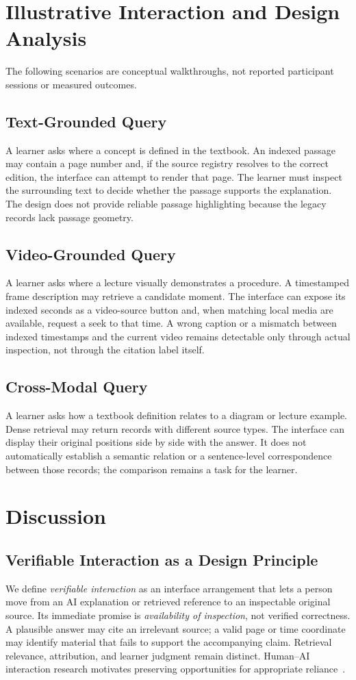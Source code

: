 \documentclass[manuscript,screen,nonacm]{acmart}
\begin{document}
\section{Illustrative Interaction and Design Analysis}
The following scenarios are conceptual walkthroughs, not reported participant sessions or measured outcomes.

\subsection{Text-Grounded Query}
A learner asks where a concept is defined in the textbook. An indexed passage may contain a page number and, if the source registry resolves to the correct edition, the interface can attempt to render that page. The learner must inspect the surrounding text to decide whether the passage supports the explanation. The design does not provide reliable passage highlighting because the legacy records lack passage geometry.

\subsection{Video-Grounded Query}
A learner asks where a lecture visually demonstrates a procedure. A timestamped frame description may retrieve a candidate moment. The interface can expose its indexed seconds as a video-source button and, when matching local media are available, request a seek to that time. A wrong caption or a mismatch between indexed timestamps and the current video remains detectable only through actual inspection, not through the citation label itself.

\subsection{Cross-Modal Query}
A learner asks how a textbook definition relates to a diagram or lecture example. Dense retrieval may return records with different source types. The interface can display their original positions side by side with the answer. It does not automatically establish a semantic relation or a sentence-level correspondence between those records; the comparison remains a task for the learner.

\section{Discussion}
\subsection{Verifiable Interaction as a Design Principle}
We define \emph{verifiable interaction} as an interface arrangement that lets a person move from an AI explanation or retrieved reference to an inspectable original source. Its immediate promise is \emph{availability of inspection}, not verified correctness. A plausible answer may cite an irrelevant source; a valid page or time coordinate may identify material that fails to support the accompanying claim. Retrieval relevance, attribution, and learner judgment remain distinct. Human--AI interaction research motivates preserving opportunities for appropriate reliance~\cite{amershi2019guidelines,holstein2020framework}.
\end{document}
